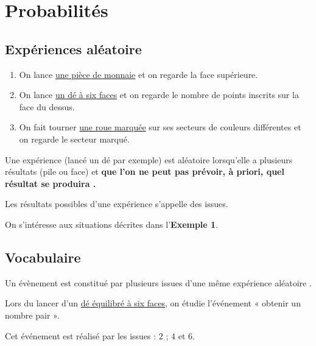 \documentclass[a4paper,10pt]{report}
\begin{document}
\newpage
\setcounter{chapter}{9}
\chapter{Probabilités}

\section{Expériences aléatoire}

\begin{ex}
\begin{enumerate}
\item On lance \href{https://fr.piliapp.com/random/coin/}{une pièce de monnaie} et on regarde la face supérieure.
\item On lance \href{https://fr.piliapp.com/random/dice/}{un dé à six faces} et on regarde le nombre de points inscrits sur la face du dessus.
\item On fait tourner \href{https://fr.piliapp.com/random/wheel/}{une roue marquée} sur ses secteurs de couleurs différentes et on regarde le secteur marqué.
\end{enumerate}
\end{ex}

\begin{defn}
Une expérience (lancé un dé par exemple) est aléatoire lorsqu'elle a plusieurs résultats (pile ou face) et \textbf{que l'on ne peut pas prévoir, à priori, quel résultat se produira .}

\medskip
\noindent Les résultats possibles d'une expérience s'appelle des issues.
\end{defn}

\begin{ex}
On s'intéresse aux situations décrites dans l'\textbf{Exemple 1}.

\medskip \noindent\grandscarreaux{\linewidth}{3.2cm}
\end{ex}

\section{Vocabulaire}

\begin{defn}
Un évènement est constitué par plusieurs issues d'une même expérience aléatoire .
\end{defn}

\begin{ex}
Lors du lancer d'un \href{https://fr.piliapp.com/random/dice/}{dé équilibré à six faces}, on étudie l'événement « obtenir un nombre pair ».

\medskip
\noindent Cet événement est réalisé par les issues : $2$ ; $4$ et $6$.
\end{ex}
\end{document}
